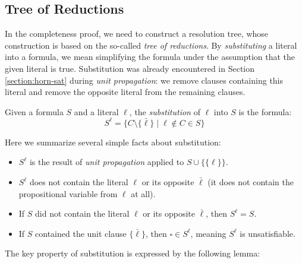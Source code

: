 \subsection{Tree of Reductions}

In the completeness proof, we need to construct a resolution tree, whose construction is based on the so-called \emph{tree of reductions}. By \emph{substituting} a literal into a formula, we mean simplifying the formula under the assumption that the given literal is true. Substitution was already encountered in Section \ref{section:horn-sat} during \emph{unit propagation}: we remove clauses containing this literal and remove the opposite literal from the remaining clauses.

\begin{definition}
    Given a formula $S$ and a literal $\ell$, the \emph{substitution} of $\ell$ into $S$ is the formula:
    $$
        S^\ell = \{C \setminus \{\bar{\ell}\} \mid \ell \notin C \in S\}
    $$    
\end{definition}

\begin{observation} Here we summarize several simple facts about substitution:
\begin{itemize}
    \item $S^\ell$ is the result of \emph{unit propagation} applied to $S \cup \{\{\ell\}\}$.
    \item $S^\ell$ does not contain the literal $\ell$ or its opposite $\bar{\ell}$ (it does not contain the propositional variable from $\ell$ at all).
    \item If $S$ did not contain the literal $\ell$ or its opposite $\bar{\ell}$, then $S^\ell = S$.
    \item If $S$ contained the unit clause $\{\bar{\ell}\}$, then $\square \in S^\ell$, meaning $S^\ell$ is unsatisfiable.
\end{itemize}    
\end{observation}

The key property of substitution is expressed by the following lemma:

